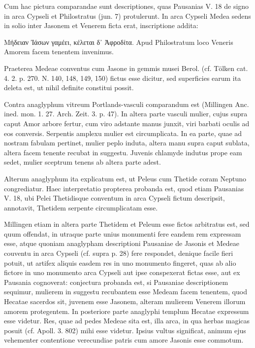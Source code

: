 \documentclass[landscape, a4paper, 11pt, oneside, polutonikogreek, german]{article}
\begin{document}
Cum hac pictura comparandae sunt descriptiones, quas Pausanias V. 18 de signo in arca Cypseli et Philostratus (jun. 7) protulerunt. In arca Cypseli Medea sedens in solio inter Jasonem et Venerem ficta erat, inscriptione addita:

Μήδειαν Ἰάσων γαμέει, κέλεται δ᾽ Ἀφροδίτα. Apud Philostratum loco Veneris Amorem facem tenentem invenimus.

Praeterea Medeae conventus cum Jasone in gemmis musei Berol. (cf. Tölken cat. 4. 2. p. 270. N. 140, 148, 149, 150) fictus esse dicitur, sed superficies earum ita deleta est, ut nihil definite constitui possit.

Contra anaglyphum vitreum Portlands-vasculi comparandum est (Millingen Anc. ined. mon. 1. 27. Arch. Zeit. 3. p. 47). In altera parte vasculi mulier, cujus supra caput Amor arbore fertur, cum viro adstante manus junxit, viri barbati oculis ad eos conversis. Serpentis amplexu mulier est circumplicata. In ea parte, quae ad nostram fabulam pertinet, mulier peplo induta, altera manu supra caput sublata, altera facem tenente recubat in suggestu. Juvenis chlamyde indutus prope eam sedet, mulier sceptrum tenens ab altera parte adest.

Alterum anaglyphum ita explicatum est, ut Peleus cum Thetide coram Neptuno congrediatur. Haec interpretatio propterea probanda est, quod etiam Pausanias V. 18, ubi Pelei Thetidisque conventum in arca Cypseli fictum descripsit, annotavit, Thetidem serpente circumplicatam esse.

Millingen etiam in altera parte Thetidem et Peleum esse fictos arbitratus est, sed quum offendat, in utraque parte unius monumenti fere eandem rem expressam esse, atque quoniam anaglypham descriptioni Pausaniae de Jasonis et Medeae couventu in arca Cypseli (cf. supra p. 28) fere respondet, denique facile fieri potuit, ut artifex aliquis easdem res in uno monumento fingeret, quas ab alio fictore in uno monumento arca Cypseli aut ipse conspexerat fictas esse, aut ex Pausania cognoverat: conjectura probanda est, si Pausaniae descriptionem sequimur, mulierem in suggestu recubantem esse Medeam facem tenentem, quod Hecatae sacerdos sit, juvenem esse Jasonem, alteram mulierem Venerem illorum amorem protegentem. In posteriore parte anaglyphi templum Hecatae expressum esse videtur. Res, quae ad pedes Medeae sita est, illa arca, in qua herbas magicas posuit (cf. Apoll. 3. 802) mihi esse videtur. Ipsius vultus significat, animum ejus vehementer contentione verecundiae patris cum amore Jasonis esse commotum.
\end{document}
